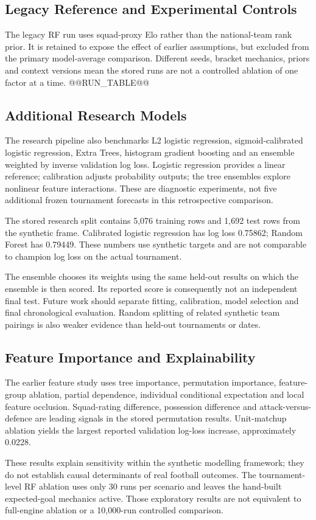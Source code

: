 \subsection{Legacy Reference and Experimental Controls}
The legacy RF run uses squad-proxy Elo rather than the national-team rank prior.
It is retained to expose the effect of earlier assumptions, but excluded from
the primary model-average comparison. Different seeds, bracket mechanics,
priors and context versions mean the stored runs are not a controlled ablation
of one factor at a time.
@@RUN_TABLE@@
\subsection{Additional Research Models}
The research pipeline also benchmarks L2 logistic regression, sigmoid-calibrated
logistic regression, Extra Trees, histogram gradient boosting and an ensemble
weighted by inverse validation log loss. Logistic regression provides a linear
reference; calibration adjusts probability outputs; the tree ensembles explore
nonlinear feature interactions. These are diagnostic experiments, not five
additional frozen tournament forecasts in this retrospective comparison.

The stored research split contains 5,076 training rows and 1,692 test rows from
the synthetic frame. Calibrated logistic regression has log loss 0.75862;
Random Forest has 0.79449. These numbers use synthetic targets and are not
comparable to champion log loss on the actual tournament.

The ensemble chooses its weights using the same held-out results on which the
ensemble is then scored. Its reported score is consequently not an independent
final test. Future work should separate fitting, calibration, model selection
and final chronological evaluation. Random splitting of related synthetic
team pairings is also weaker evidence than held-out tournaments or dates.
\subsection{Feature Importance and Explainability}
The earlier feature study uses tree importance, permutation importance,
feature-group ablation, partial dependence, individual conditional expectation
and local feature occlusion. Squad-rating difference, possession difference and
attack-versus-defence are leading signals in the stored permutation results.
Unit-matchup ablation yields the largest reported validation log-loss increase,
approximately 0.0228.

These results explain sensitivity within the synthetic modelling framework;
they do not establish causal determinants of real football outcomes. The
tournament-level RF ablation uses only 30 runs per scenario and leaves the
hand-built expected-goal mechanics active. Those exploratory results are not
equivalent to full-engine ablation or a 10,000-run controlled comparison.
\clearpage
